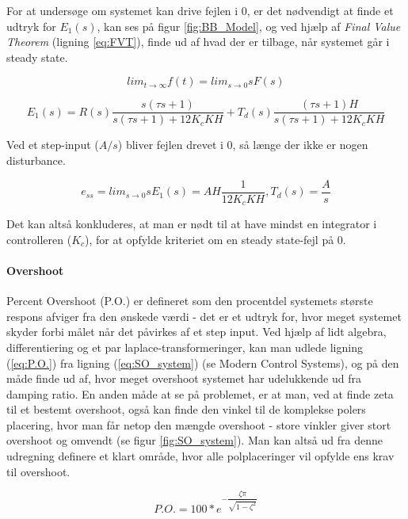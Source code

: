 For at undersøge om systemet kan drive fejlen i 0, er det nødvendigt at finde et udtryk for $E_{1}(s)$, kan ses på figur \ref{fig:BB_Model}, og ved hjælp af \textit{Final Value Theorem} (ligning \ref{eq:FVT}), finde ud af hvad der er tilbage, når systemet går i steady state. 

\begin{equation} \label{eq:FVT}
lim_{t \to \infty} f(t) = lim_{s \to 0} sF(s)
\end{equation}

\begin{equation} \label{eq:ess}
E_{1}(s)=R(s)\frac{s(\tau s+1)}{s(\tau s+1)+12K_{c}KH}+T_{d}(s)\frac{(\tau s+1)H}{s(\tau s+1)+12K_{c}KH}
\end{equation}

Ved et step-input ($A/s$) bliver fejlen drevet i 0, så længe der ikke er nogen disturbance. 

\begin{equation}
e_{ss}=lim_{s \to 0} sE_{1}(s)=AH\frac{1}{12K_{c}KH} , T_{d}(s)=\dfrac{A}{s}
\end{equation}

Det kan altså konkluderes, at man er nødt til at have mindst en integrator i controlleren ($K_{c}$), for at opfylde kriteriet om en steady state-fejl på 0. 

\paragraph{Overshoot}

Percent Overshoot (P.O.) er defineret som den procentdel systemets største respons afviger fra den ønskede værdi - det er et udtryk for, hvor meget systemet skyder forbi målet når det påvirkes af et step input. Ved hjælp af lidt algebra, differentiering og et par laplace-transformeringer, kan man udlede ligning (\ref{eq:P.O.}) fra ligning (\ref{eq:SO_system}) (se Modern Control Systems\cite{ModernControlSystem}), og på den måde finde ud af, hvor meget overshoot systemet har udelukkende ud fra damping ratio. En anden måde at se på problemet, er at man, ved at finde zeta til et bestemt overshoot, også kan finde den vinkel til de komplekse polers placering, hvor man får netop den mængde overshoot - store vinkler giver stort overshoot og omvendt (se figur \ref{fig:SO_system}). Man kan altså ud fra denne udregning definere et klart område, hvor alle polplaceringer vil opfylde ens krav til overshoot. 

\begin{equation}\label{eq:P.O.}
P.O.=100*e^{-\dfrac{\zeta\pi}{\sqrt{1-\zeta^2}}}
\end{equation}

